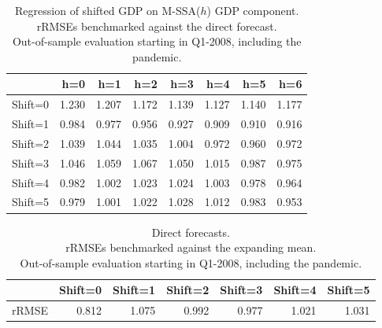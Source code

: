 \documentclass[11pt,a4paper]{article}
\begin{document}
\begin{table}[ht]
\centering
\begin{tabular}{rrrrrrrr}
  \hline
 & h=0 & h=1 & h=2 & h=3 & h=4 & h=5 & h=6 \\ 
  \hline
Shift=0 & 1.230 & 1.207 & 1.172 & 1.139 & 1.127 & 1.140 & 1.177 \\ 
  Shift=1 & 0.984 & 0.977 & 0.956 & 0.927 & 0.909 & 0.910 & 0.916 \\ 
  Shift=2 & 1.039 & 1.044 & 1.035 & 1.004 & 0.972 & 0.960 & 0.972 \\ 
  Shift=3 & 1.046 & 1.059 & 1.067 & 1.050 & 1.015 & 0.987 & 0.975 \\ 
  Shift=4 & 0.982 & 1.002 & 1.023 & 1.024 & 1.003 & 0.978 & 0.964 \\ 
  Shift=5 & 0.979 & 1.001 & 1.022 & 1.028 & 1.012 & 0.983 & 0.953 \\   
   \hline
\end{tabular}
\caption{Regression of shifted GDP on M-SSA($h$) GDP component.\\rRMSEs benchmarked against the direct forecast.\\Out-of-sample evaluation starting in Q1-2008, including the pandemic.} 
\label{rRMSE_mSSA_comp_direct3}
\end{table}%
\begin{table}[ht]
\centering
\begin{tabular}{rrrrrrr}
  \hline
 & Shift=0 & Shift=1 & Shift=2 & Shift=3 & Shift=4 & Shift=5 \\ 
  \hline
rRMSE & 0.812 & 1.075 & 0.992 & 0.977 & 1.021 & 1.031 \\ 
   \hline
\end{tabular}
\caption{Direct forecasts.\\
rRMSEs benchmarked against the expanding mean.\\Out-of-sample evaluation starting in Q1-2008, including the pandemic.} 
\label{rRMSE_mSSA_direct_mean4}
\end{table}
\end{document}
